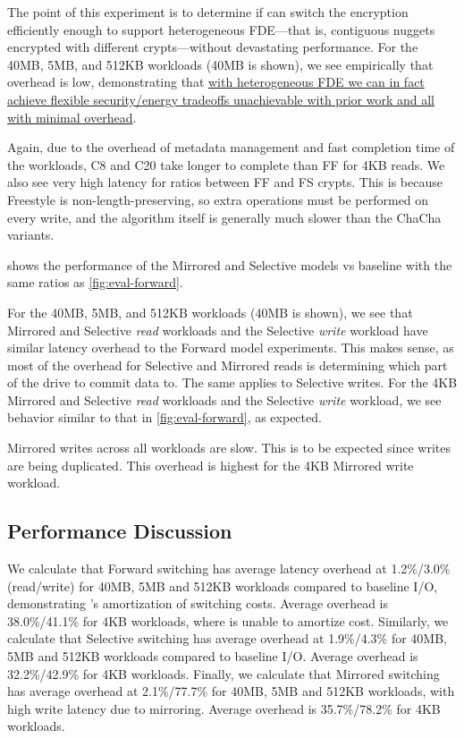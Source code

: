 

The point of this experiment is to determine if \sys can switch the encryption
efficiently enough to support heterogeneous FDE---that is, contiguous nuggets
encrypted with different crypts---without devastating performance. For the 40MB,
5MB, and 512KB workloads (40MB is shown), we see empirically that overhead is
low, demonstrating that \uline{with heterogeneous FDE we can in fact achieve
flexible security/energy tradeoffs unachievable with prior work and all with
minimal overhead}.

Again, due to the overhead of metadata management and fast completion time of
the workloads, C8 and C20 take longer to complete than FF for 4KB reads. We also
see very high latency for ratios between FF and FS crypts. This is because
Freestyle is non-length-preserving, so extra operations must be performed on
every write, and the algorithm itself is generally much slower than the ChaCha
variants.

 shows the performance of the Mirrored and Selective models vs
baseline with the same ratios as \cref{fig:eval-forward}.

For the 40MB, 5MB, and 512KB workloads (40MB is shown), we see that Mirrored and
Selective {\em read} workloads and the Selective {\em write} workload have
similar latency overhead to the Forward model experiments. This makes sense, as
most of the overhead for Selective and Mirrored reads is determining which part
of the drive to commit data to. The same applies to Selective writes. For the
4KB Mirrored and Selective {\em read} workloads and the Selective {\em write}
workload, we see behavior similar to that in \cref{fig:eval-forward}, as
expected.

Mirrored writes across all workloads are slow. This is to be expected since
writes are being duplicated. This overhead is highest for the 4KB Mirrored write
workload.


\subsection{Performance Discussion}\label{subsec:eval-overhead}

We calculate that Forward switching has average latency overhead at 1.2\%/3.0\%
(read/write) for 40MB, 5MB and 512KB workloads compared to baseline I/O,
demonstrating \sys's amortization of switching costs. Average overhead is
38.0\%/41.1\% for 4KB workloads, where \sys is unable to amortize cost.
Similarly, we calculate that Selective switching has average overhead at
1.9\%/4.3\% for 40MB, 5MB and 512KB workloads compared to baseline I/O. Average
overhead is 32.2\%/42.9\% for 4KB workloads. Finally, we calculate that Mirrored
switching has average overhead at 2.1\%/77.7\% for 40MB, 5MB and 512KB
workloads, with high write latency due to mirroring. Average overhead is
35.7\%/78.2\% for 4KB workloads.

